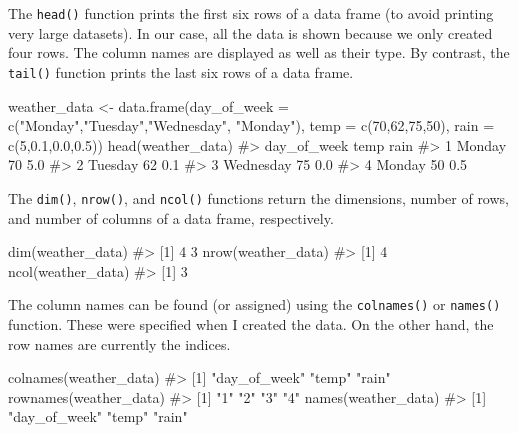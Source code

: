 \documentclass[
  letterpaper,
]{krantz}
\makeatletter
\newenvironment{Shaded}{\begin{snugshade}}{\end{snugshade}}
\newcommand{\AttributeTok}[1]{\textcolor[rgb]{0.40,0.45,0.13}{#1}}
\newcommand{\CommentTok}[1]{\textcolor[rgb]{0.37,0.37,0.37}{#1}}
\newcommand{\DecValTok}[1]{\textcolor[rgb]{0.68,0.00,0.00}{#1}}
\newcommand{\FloatTok}[1]{\textcolor[rgb]{0.68,0.00,0.00}{#1}}
\newcommand{\FunctionTok}[1]{\textcolor[rgb]{0.28,0.35,0.67}{#1}}
\newcommand{\NormalTok}[1]{\textcolor[rgb]{0.00,0.23,0.31}{#1}}
\newcommand{\OtherTok}[1]{\textcolor[rgb]{0.00,0.23,0.31}{#1}}
\newcommand{\StringTok}[1]{\textcolor[rgb]{0.13,0.47,0.30}{#1}}
\newenvironment{kframe}{%
\medskip{}
\setlength{\fboxsep}{.8em}
 \def\at@end@of@kframe{}%
 \ifinner\ifhmode%
  \def\at@end@of@kframe{\end{minipage}}%
  \begin{minipage}{\columnwidth}%
 \fi\fi%
 \def\FrameCommand##1{\hskip\@totalleftmargin \hskip-\fboxsep
 \colorbox{shadecolor}{##1}\hskip-\fboxsep
     \hskip-\linewidth \hskip-\@totalleftmargin \hskip\columnwidth}%
 \MakeFramed {\advance\hsize-\width
   \@totalleftmargin\z@ \linewidth\hsize
   \@setminipage}}%
 {\par\unskip\endMakeFramed%
 \at@end@of@kframe}
\renewenvironment{Shaded}{\begin{kframe}}{\end{kframe}}
\makeatother
\begin{document}
The \texttt{head()} function prints the first six rows of a data frame
(to avoid printing very large datasets). In our case, all the data is
shown because we only created four rows. The column names are displayed
as well as their type. By contrast, the \texttt{tail()} function prints
the last six rows of a data frame.

\begin{Shaded}
\begin{Highlighting}[]
\NormalTok{weather\_data }\OtherTok{\textless{}{-}} \FunctionTok{data.frame}\NormalTok{(}\AttributeTok{day\_of\_week =} \FunctionTok{c}\NormalTok{(}\StringTok{"Monday"}\NormalTok{,}\StringTok{"Tuesday"}\NormalTok{,}\StringTok{"Wednesday"}\NormalTok{,}
                                           \StringTok{"Monday"}\NormalTok{), }
                           \AttributeTok{temp =} \FunctionTok{c}\NormalTok{(}\DecValTok{70}\NormalTok{,}\DecValTok{62}\NormalTok{,}\DecValTok{75}\NormalTok{,}\DecValTok{50}\NormalTok{), }\AttributeTok{rain =} \FunctionTok{c}\NormalTok{(}\DecValTok{5}\NormalTok{,}\FloatTok{0.1}\NormalTok{,}\FloatTok{0.0}\NormalTok{,}\FloatTok{0.5}\NormalTok{))}
\FunctionTok{head}\NormalTok{(weather\_data)}
\CommentTok{\#\textgreater{}   day\_of\_week temp rain}
\CommentTok{\#\textgreater{} 1      Monday   70  5.0}
\CommentTok{\#\textgreater{} 2     Tuesday   62  0.1}
\CommentTok{\#\textgreater{} 3   Wednesday   75  0.0}
\CommentTok{\#\textgreater{} 4      Monday   50  0.5}
\end{Highlighting}
\end{Shaded}

The \texttt{dim()}, \texttt{nrow()}, and \texttt{ncol()} functions
return the dimensions, number of rows, and number of columns of a data
frame, respectively.

\begin{Shaded}
\begin{Highlighting}[]
\FunctionTok{dim}\NormalTok{(weather\_data)}
\CommentTok{\#\textgreater{} [1] 4 3}
\FunctionTok{nrow}\NormalTok{(weather\_data)}
\CommentTok{\#\textgreater{} [1] 4}
\FunctionTok{ncol}\NormalTok{(weather\_data)}
\CommentTok{\#\textgreater{} [1] 3}
\end{Highlighting}
\end{Shaded}

The column names can be found (or assigned) using the
\texttt{colnames()} or \texttt{names()} function. These were specified
when I created the data. On the other hand, the row names are currently
the indices.

\begin{Shaded}
\begin{Highlighting}[]
\FunctionTok{colnames}\NormalTok{(weather\_data)}
\CommentTok{\#\textgreater{} [1] "day\_of\_week" "temp"        "rain"}
\FunctionTok{rownames}\NormalTok{(weather\_data)}
\CommentTok{\#\textgreater{} [1] "1" "2" "3" "4"}
\FunctionTok{names}\NormalTok{(weather\_data)}
\CommentTok{\#\textgreater{} [1] "day\_of\_week" "temp"        "rain"}
\end{Highlighting}
\end{Shaded}
\end{document}
